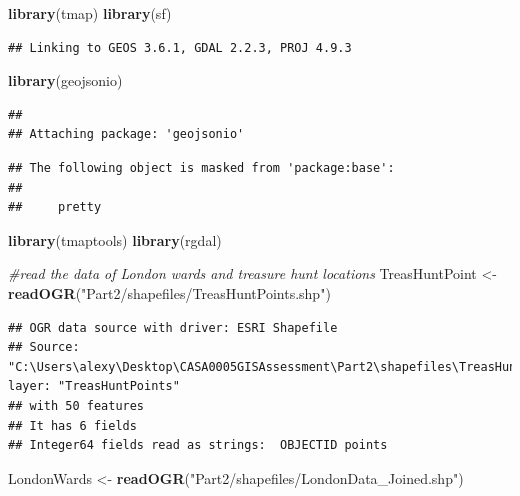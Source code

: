\documentclass[]{article}
\newenvironment{Shaded}{\begin{snugshade}}{\end{snugshade}}
\newcommand{\KeywordTok}[1]{\textcolor[rgb]{0.13,0.29,0.53}{\textbf{#1}}}
\newcommand{\StringTok}[1]{\textcolor[rgb]{0.31,0.60,0.02}{#1}}
\newcommand{\CommentTok}[1]{\textcolor[rgb]{0.56,0.35,0.01}{\textit{#1}}}
\newcommand{\NormalTok}[1]{#1}
\begin{document}
\begin{Shaded}
\begin{Highlighting}[]
\KeywordTok{library}\NormalTok{(tmap)}
\KeywordTok{library}\NormalTok{(sf)}
\end{Highlighting}
\end{Shaded}

\begin{verbatim}
## Linking to GEOS 3.6.1, GDAL 2.2.3, PROJ 4.9.3
\end{verbatim}

\begin{Shaded}
\begin{Highlighting}[]
\KeywordTok{library}\NormalTok{(geojsonio)}
\end{Highlighting}
\end{Shaded}

\begin{verbatim}
## 
## Attaching package: 'geojsonio'
\end{verbatim}

\begin{verbatim}
## The following object is masked from 'package:base':
## 
##     pretty
\end{verbatim}

\begin{Shaded}
\begin{Highlighting}[]
\KeywordTok{library}\NormalTok{(tmaptools)}
\KeywordTok{library}\NormalTok{(rgdal)}

\CommentTok{#read the data of London wards and treasure hunt locations}
\NormalTok{TreasHuntPoint <-}\StringTok{ }\KeywordTok{readOGR}\NormalTok{(}\StringTok{"Part2/shapefiles/TreasHuntPoints.shp"}\NormalTok{)}
\end{Highlighting}
\end{Shaded}

\begin{verbatim}
## OGR data source with driver: ESRI Shapefile 
## Source: "C:\Users\alexy\Desktop\CASA0005GISAssessment\Part2\shapefiles\TreasHuntPoints.shp", layer: "TreasHuntPoints"
## with 50 features
## It has 6 fields
## Integer64 fields read as strings:  OBJECTID points
\end{verbatim}

\begin{Shaded}
\begin{Highlighting}[]
\NormalTok{LondonWards <-}\StringTok{ }\KeywordTok{readOGR}\NormalTok{(}\StringTok{"Part2/shapefiles/LondonData_Joined.shp"}\NormalTok{)}
\end{Highlighting}
\end{Shaded}
\end{document}
